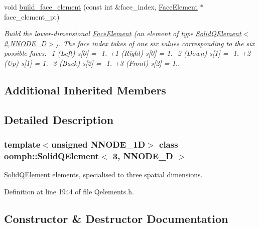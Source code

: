 \begin{DoxyCompactItemize}
void \hyperlink{classoomph_1_1SolidQElement_3_013_00_01NNODE__1D_01_4_afef062d54dc1803292d8a9a4634afe1c}{build\+\_\+face\+\_\+element} (const int \&face\+\_\+index, \hyperlink{classoomph_1_1FaceElement}{Face\+Element} $\ast$face\+\_\+element\+\_\+pt)
\begin{DoxyCompactList}\small\item\em Build the lower-\/dimensional \hyperlink{classoomph_1_1FaceElement}{Face\+Element} (an element of type \hyperlink{classoomph_1_1SolidQElement_3_012_00_01NNODE__1D_01_4}{Solid\+Q\+Element$<$2,\+N\+N\+O\+D\+E\+\_\+D$>$}). The face index takes of one six values corresponding to the six possible faces\+: -\/1 (Left) s\mbox{[}0\mbox{]} = -\/1. +1 (Right) s\mbox{[}0\mbox{]} = 1. -\/2 (Down) s\mbox{[}1\mbox{]} = -\/1. +2 (Up) s\mbox{[}1\mbox{]} = 1. -\/3 (Back) s\mbox{[}2\mbox{]} = -\/1. +3 (Front) s\mbox{[}2\mbox{]} = 1.. \end{DoxyCompactList}\end{DoxyCompactItemize}
\subsection*{Additional Inherited Members}


\subsection{Detailed Description}
\subsubsection*{template$<$unsigned N\+N\+O\+D\+E\+\_\+1D$>$\newline
class oomph\+::\+Solid\+Q\+Element$<$ 3, N\+N\+O\+D\+E\+\_\+D $>$}

\hyperlink{classoomph_1_1SolidQElement}{Solid\+Q\+Element} elements, specialised to three spatial dimensions. 

Definition at line 1944 of file Qelements.\+h.



\subsection{Constructor \& Destructor Documentation}
\mbox{\label{classoomph_1_1SolidQElement_3_013_00_01NNODE__1D_01_4_a900c735691c53d5b53506cb0f095d5d6}} 
